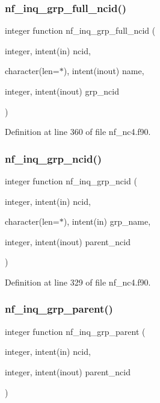 \subsubsection{\texorpdfstring{nf\+\_\+inq\+\_\+grp\+\_\+full\+\_\+ncid()}{nf\_inq\_grp\_full\_ncid()}}
{\footnotesize\ttfamily integer function nf\+\_\+inq\+\_\+grp\+\_\+full\+\_\+ncid (\begin{DoxyParamCaption}\item[{integer, intent(in)}]{ncid,  }\item[{character(len=$\ast$), intent(inout)}]{name,  }\item[{integer, intent(inout)}]{grp\+\_\+ncid }\end{DoxyParamCaption})}



Definition at line 360 of file nf\+\_\+nc4.\+f90.

\mbox{\label{nf__nc4_8f90_a8f1edecefc4e38f9faee088c2b195ee9}} 
\subsubsection{\texorpdfstring{nf\+\_\+inq\+\_\+grp\+\_\+ncid()}{nf\_inq\_grp\_ncid()}}
{\footnotesize\ttfamily integer function nf\+\_\+inq\+\_\+grp\+\_\+ncid (\begin{DoxyParamCaption}\item[{integer, intent(in)}]{ncid,  }\item[{character(len=$\ast$), intent(in)}]{grp\+\_\+name,  }\item[{integer, intent(inout)}]{parent\+\_\+ncid }\end{DoxyParamCaption})}



Definition at line 329 of file nf\+\_\+nc4.\+f90.

\mbox{\label{nf__nc4_8f90_a9b77fa66e690b8b97322f8c92c528bb7}} 
\subsubsection{\texorpdfstring{nf\+\_\+inq\+\_\+grp\+\_\+parent()}{nf\_inq\_grp\_parent()}}
{\footnotesize\ttfamily integer function nf\+\_\+inq\+\_\+grp\+\_\+parent (\begin{DoxyParamCaption}\item[{integer, intent(in)}]{ncid,  }\item[{integer, intent(inout)}]{parent\+\_\+ncid }\end{DoxyParamCaption})}



